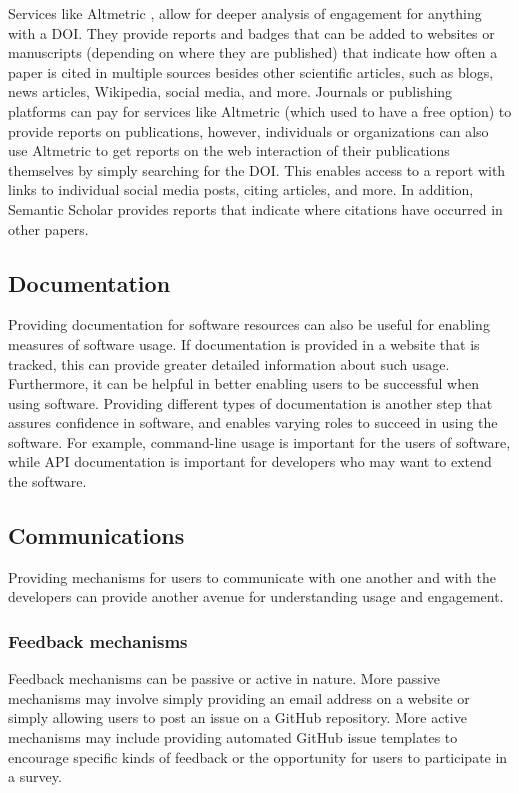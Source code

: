 \documentclass{article}
\begin{document}
Services like Altmetric \cite{noauthor_altmetric_2015}, allow for deeper analysis of engagement for anything with a DOI. They provide reports and badges that can be added to websites or manuscripts (depending on where they are published) that indicate how often a paper is cited in multiple sources besides other scientific articles, such as blogs, news articles, Wikipedia, social media, and more.  Journals or publishing platforms can pay for services like Altmetric (which used to have a free option) to provide reports on publications, however, individuals or organizations can also use Altmetric to get reports on the web interaction of their publications themselves by simply searching for the DOI. This enables access to a report with links to individual social media posts, citing articles, and more. In addition, Semantic Scholar \cite{noauthor_semantic_nodate} provides reports that indicate where citations have occurred in other papers. 


\subsection{Documentation}
Providing documentation for software resources can also be useful for enabling measures of software usage. If documentation is provided in a website that is tracked, this can provide greater detailed information about such usage. Furthermore, it can be helpful in better enabling users to be successful when using software. Providing different types of documentation is another step that assures confidence in software, and enables varying roles to succeed in using the software. For example, command-line usage is important for the users of software, while API documentation is important for developers who may want to extend the software.

\subsection{Communications} 
Providing mechanisms for users to communicate with one another and with the developers can provide another avenue for understanding usage and engagement.

\subsubsection{Feedback mechanisms}
Feedback mechanisms can be passive or active in nature. More passive mechanisms may involve simply providing an email address on a website or simply allowing users to post an issue on a GitHub repository. More active mechanisms may include providing automated GitHub issue templates to encourage specific kinds of feedback or the opportunity for users to participate in a survey.
\end{document}
